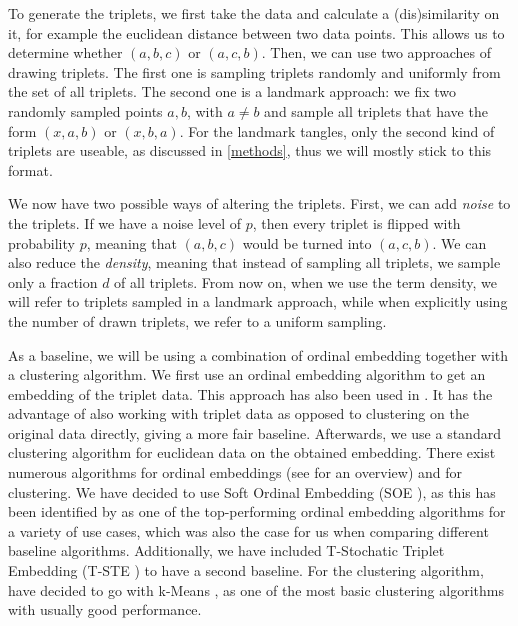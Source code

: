 To generate the triplets, we first take the data and calculate a (dis)similarity on it, for example the euclidean distance between two data points. This allows
us to determine whether $(a,b,c)$ or $(a,c,b)$.
Then, we can use two approaches of drawing triplets. The first one is sampling triplets randomly and uniformly from the set of all triplets. The second one is a landmark approach:
we fix two randomly sampled points $a,b$, with $a \neq b$ and sample all triplets that have the form $(x,a,b)$ or $(x,b,a)$.  For the landmark tangles, only the 
second kind of triplets are useable, as discussed in \autoref{methods}, thus we will mostly stick to this format. 

We now have two possible ways of altering the triplets. First, we can add \textit{noise}
to the triplets. If we have a noise level of $p$, then every triplet is flipped with probability $p$, meaning that $(a,b,c)$ would be turned into $(a,c,b)$. We can also reduce
the \textit{density}, meaning that instead of sampling all triplets, we sample only a fraction $d$ of all triplets. From now on, when we use the term density, we
will refer to triplets sampled in a landmark approach, while when explicitly using the number of drawn triplets, we refer to a uniform sampling.

As a baseline, we will be using a combination of ordinal embedding together with a clustering algorithm. 
We first use an ordinal embedding algorithm to get an embedding of the triplet data. This approach has also been used in \cite{kleindessnerLensDepthFunction2017}. 
It has the advantage of also working with triplet data as opposed to clustering on the original data directly, giving a more fair baseline.
Afterwards, we use a standard clustering algorithm for euclidean data on the obtained embedding.  
There exist numerous algorithms for ordinal embeddings (see \cite{vankadaraInsightsOrdinalEmbedding2021} for an overview) and for clustering.  We have decided to use Soft Ordinal Embedding (SOE \cite{teradaLocalOrdinalEmbedding2014}), as this has been identified by \cite{vankadaraInsightsOrdinalEmbedding2021} as one of the 
top-performing ordinal embedding algorithms for a variety of use cases, which was also the case for us when comparing different baseline algorithms.
Additionally, we have included T-Stochatic Triplet Embedding (T-STE \cite{laurensvandermaatenStochasticTripletEmbedding2012}) 
to have a second baseline. For the clustering algorithm, have decided to go with k-Means \citep{lloydLeastSquaresQuantization1982}, as one of the most basic clustering algorithms with usually good performance.

